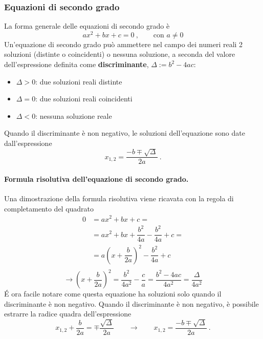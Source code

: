 \subsubsection{Equazioni di secondo grado}
La forma generale delle equazioni di secondo grado è
\begin{equation}
    a x^2 + b x + c = 0 \ , \qquad \text{con $a \ne 0$}
\end{equation}
%
Un'equazione di secondo grado può ammettere nel campo dei numeri reali 2 soluzioni (distinte o coincidenti) o nessuna soluzione, a seconda del valore dell'espressione definita come \textbf{discriminante}, $\Delta := b^2 - 4 a c$:
\begin{itemize}
    \item $\Delta > 0$: due soluzioni reali distinte
    \item $\Delta = 0$: due soluzioni reali coincidenti
    \item $\Delta < 0$: nessuna soluzione reale
\end{itemize}
Quando il discriminante è non negativo, le soluzioni dell'equazione sono date dall'espressione
\begin{equation}
    x_{1,2} = \dfrac{-b \mp \sqrt{\Delta}}{2a} \ .
\end{equation}
%
\paragraph{Formula risolutiva dell'equazione di secondo grado.}
Una dimostrazione della formula risolutiva viene ricavata con la regola di completamento del quadrato
\begin{equation}
    \begin{aligned}
        0 & = a x^2 + b x + c = \\
          & = a x^2 + b x + \dfrac{b^2}{4a} - \dfrac{b^2}{4a} + c = \\
          & = a \left(x + \dfrac{b}{2a} \right)^2 - \dfrac{b^2}{4a} + c \\
    \end{aligned}
\end{equation}
\begin{equation}
    \rightarrow \left( x + \dfrac{b}{2a} \right)^2 = \dfrac{b^2}{4 a^2} - \dfrac{c}{a} = \dfrac{b^2 - 4 a c}{4a^2} = \dfrac{\Delta}{4a^2}
\end{equation}
\'E ora facile notare come questa equazione ha soluzioni solo quando il discriminante è non negativo. Quando il discriminante è non negativo, è possibile estrarre la radice quadra dell'espressione
\begin{equation}
    x_{1,2} + \dfrac{b}{2a} = \mp \dfrac{\sqrt{\Delta}}{2a} \qquad \rightarrow \qquad 
    x_{1,2} = \dfrac{-b  \mp \sqrt{\Delta}}{2a} \ . 
\end{equation}

